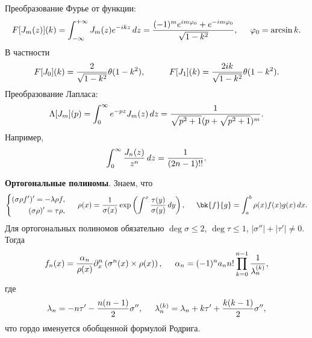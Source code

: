 Преобразование Фурье от функции:
\begin{equation*}
    F[J_m (z)] (k) = \int_{-\infty}^{+\infty} J_m (z) e^{-ikz} \, d z 
    = \frac{(-1)^m e^{i m \varphi_0} + e^{- i m \varphi_0}}{\sqrt{1 - k^2}}, \hspace{5 mm} 
    \varphi_0 = \arcsin k.
\end{equation*}
В частности
\begin{equation*}
    F[J_0](k) = \frac{2}{\sqrt{1-k^2}} \theta(1-k^2), \hspace{10 mm} 
    F[J_1](k) = \frac{2 i k}{\sqrt{1 - k^2}} \theta(1-k^2).
\end{equation*}
Преобразование Лапласа:
\begin{equation*}
    \Lambda[J_m] (p)=  \int_{0}^{\infty}  e^{- p z} J_m (z) \, d z = 
    \frac{1}{\sqrt{p^2 + 1} (p + \sqrt{p^2 + 1})^m}.
\end{equation*}
Например,
\begin{equation*}
    \int_{0}^{\infty} \frac{J_n (z)}{z^n} \, d z = \frac{1}{(2n-1)!!}.
\end{equation*}


\textbf{Ортогональные полиномы}. Знаем, что
\begin{equation*}
    \left\{\begin{aligned}
        (\sigma \rho f')' = - \lambda \rho f, \\
        (\sigma \rho)' =  \tau \rho,
    \end{aligned}\right.
    \hspace{5 mm} 
    \rho(x) = \frac{1}{\sigma(x)} \exp\left(
        \int_{}^{x} \frac{\tau(y)}{\sigma(y)} \d y
    \right),
    \hspace{5 mm} 
    \bk{f}{g} = \int_{a}^{b} \rho(x) f(x) g(x) \d x.
\end{equation*}
Для ортогональных полиномов обязательно $\deg \sigma \leq 2$, $\deg \tau \leq 1$, $|\sigma''|+ |\tau'| \neq 0$. Тогда
\begin{equation*}
    f_n (x) = \frac{\alpha_n}{\rho(x)} \partial_x^n \left(\sigma^n (x) \times \rho(x)\right), \hspace{5 mm}     
    \alpha_n = (-1)^n a_n n! \prod_{k=0}^{n-1} \frac{1}{\lambda_n^{(k)}},
\end{equation*}
где 
\begin{equation*}
    \lambda_n = - n \tau' - \frac{n (n-1)}{2} \sigma'',
    \hspace{5 mm} 
    \lambda_n^{(k)} = \lambda_n + k \tau' + \frac{k (k-1)}{2} \sigma'',
\end{equation*}
что гордо именуется обобщенной формулой Родрига. 

